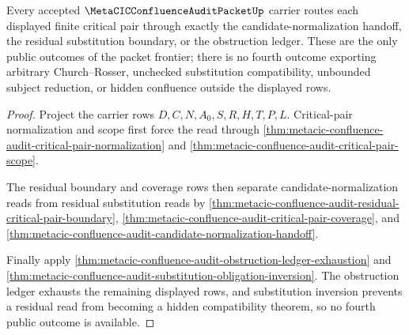 \begin{theorem}
\label{thm:metacic-confluence-audit-finite-critical-pair-frontier}
Every accepted $\MetaCICConfluenceAuditPacketUp$ carrier routes each displayed finite critical pair through exactly the candidate-normalization handoff, the residual substitution boundary, or the obstruction ledger. These are the only public outcomes of the packet frontier; there is no fourth outcome exporting arbitrary Church--Rosser, unchecked substitution compatibility, unbounded subject reduction, or hidden confluence outside the displayed rows.
\end{theorem}
\begin{proof}
Project the carrier rows $D,C,N,A_0,S,R,H,T,P,L$. Critical-pair normalization and scope first force the read through \autoref{thm:metacic-confluence-audit-critical-pair-normalization} and \autoref{thm:metacic-confluence-audit-critical-pair-scope}.

The residual boundary and coverage rows then separate candidate-normalization reads from residual substitution reads by \autoref{thm:metacic-confluence-audit-residual-critical-pair-boundary}, \autoref{thm:metacic-confluence-audit-critical-pair-coverage}, and \autoref{thm:metacic-confluence-audit-candidate-normalization-handoff}.

Finally apply \autoref{thm:metacic-confluence-audit-obstruction-ledger-exhaustion} and \autoref{thm:metacic-confluence-audit-substitution-obligation-inversion}. The obstruction ledger exhausts the remaining displayed rows, and substitution inversion prevents a residual read from becoming a hidden compatibility theorem, so no fourth public outcome is available.
\end{proof}

